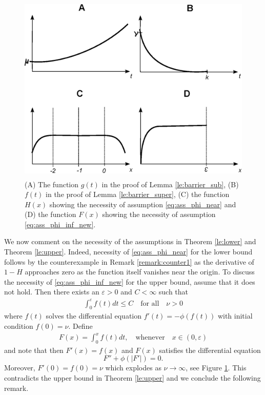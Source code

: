 \documentclass[12pt]{article}
\newtheorem{remark}[theorem]{Remark}
\numberwithin{komcounter}{section}
\begin{document}
%
\begin{figure}%
\begin{center}
\includegraphics[width=14cm,height=9.1cm,viewport=0 0 460 365,clip]{F2020.eps}
\end{center}
\caption{(A) The function $g(t)$ in the proof of Lemma \ref{le:barrier_sub}, (B) $f(t)$ in the proof of Lemma \ref{le:barrier_super}, (C) the function $H(x)$ showing the necessity of assumption \eqref{eq:ass_phi_near} and (D) the function $F(x)$ showing the necessity of assumption \eqref{eq:ass_phi_inf_new}.}
\label{fig:functions}
\end{figure}
%

We now comment on the necessity of the assumptions in Theorem \ref{le:lower} and Theorem \ref{le:upper}.
Indeed, necessity of \eqref{eq:ass_phi_near} for the lower bound follows by the counterexample in Remark \ref{remark:counter1} as
the derivative of $1 - H$ approaches zero as the function itself vanishes near the origin.
To discuss the necessity of \eqref{eq:ass_phi_inf_new} for the upper bound,
assume that it does not hold.
Then there exists an $\varepsilon > 0$ and $C < \infty$ such that
%
\begin{align*}
 \int_{0}^{\varepsilon} f(t) dt \leq C  \quad\text{for all} \quad \nu > 0 %
\end{align*}
%
where $f(t)$ solves the differential equation $f'(t) = - \phi(f(t))$ with initial condition $f(0) = \nu$.
Define
%
\begin{align*}
F(x) =   \int_{0}^{x} f(t) dt, \quad \text{whenever}\quad x \in  (0,\varepsilon)
\end{align*}
%
and note that then $F'(x) = f(x)$ and $F(x)$ satisfies the differential equation
%
$$
F'' + \phi(|F'|) = 0.
$$
%
Moreover, $F'(0) = f(0) = \nu$ which explodes as $\nu \to \infty$, see Figure \ref{fig:functions}.
This contradicts the upper bound in Theorem \ref{le:upper} and we conclude the following remark.
\end{document}
